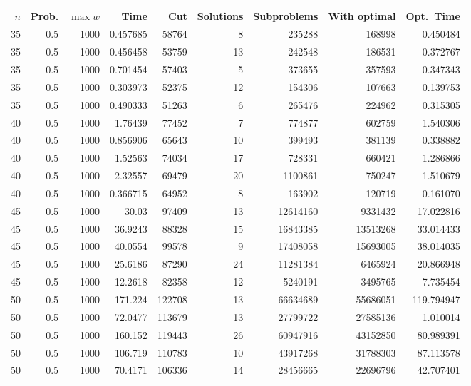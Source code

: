 \documentclass[a4paper,11pt]{article}
\begin{document}
\begin{table}
\begin{center}
\begin{tabular}{|rrr|r|r|rrr|r|}
\hline
$n$ & Prob. & $\max w$ & Time & Cut & Solutions & Subproblems & With
optimal & Opt.\ Time \\
\hline
35 & 0.5 & 1000 & 0.457685 & 58764 & 8 & 235288 & 168998 & 0.450484 \\
35 & 0.5 & 1000 & 0.456458 & 53759 & 13 & 242548 & 186531 & 0.372767 \\
35 & 0.5 & 1000 & 0.701454 & 57403 & 5 & 373655 & 357593 & 0.347343 \\
35 & 0.5 & 1000 & 0.303973 & 52375 & 12 & 154306 & 107663 & 0.139753 \\
35 & 0.5 & 1000 & 0.490333 & 51263 & 6 & 265476 & 224962 & 0.315305 \\
40 & 0.5 & 1000 & 1.76439 & 77452 & 7 & 774877 & 602759 & 1.540306 \\
40 & 0.5 & 1000 & 0.856906 & 65643 & 10 & 399493 & 381139 & 0.338882 \\
40 & 0.5 & 1000 & 1.52563 & 74034 & 17 & 728331 & 660421 & 1.286866 \\
40 & 0.5 & 1000 & 2.32557 & 69479 & 20 & 1100861 & 750247 & 1.510679 \\
40 & 0.5 & 1000 & 0.366715 & 64952 & 8 & 163902 & 120719 & 0.161070 \\
45 & 0.5 & 1000 & 30.03 & 97409 & 13 & 12614160 & 9331432 & 17.022816 \\
45 & 0.5 & 1000 & 36.9243 & 88328 & 15 & 16843385 & 13513268 & 33.014433 \\
45 & 0.5 & 1000 & 40.0554 & 99578 & 9 & 17408058 & 15693005 & 38.014035 \\
45 & 0.5 & 1000 & 25.6186 & 87290 & 24 & 11281384 & 6465924 & 20.866948 \\
45 & 0.5 & 1000 & 12.2618 & 82358 & 12 & 5240191 & 3495765 & 7.735454 \\
50 & 0.5 & 1000 & 171.224 & 122708 & 13 & 66634689 & 55686051 & 119.794947 \\
50 & 0.5 & 1000 & 72.0477 & 113679 & 13 & 27799722 & 27585136 & 1.010014 \\
50 & 0.5 & 1000 & 160.152 & 119443 & 26 & 60947916 & 43152850 & 80.989391 \\
50 & 0.5 & 1000 & 106.719 & 110783 & 10 & 43917268 & 31788303 & 87.113578 \\
50 & 0.5 & 1000 & 70.4171 & 106336 & 14 & 28456665 & 22696796 & 42.707401 \\
\hline

\end{tabular}
\end{center}
\end{table}
\end{document}
